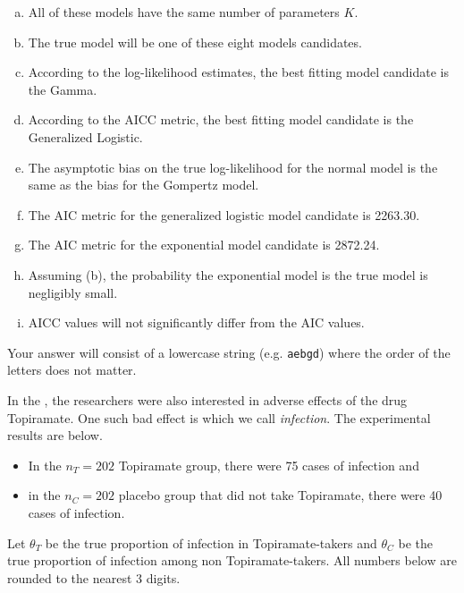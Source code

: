\documentclass[12pt,landscape]{article}
\newcommand{\instr}{\small Your answer will consist of a lowercase string (e.g. \texttt{aebgd}) where the order of the letters does not matter. \normalsize}
\begin{document}
\begin{enumerate}[(a)]
\item All of these models have the same number of parameters $K$.
\item The true model will be one of these eight models candidates.
\item According to the log-likelihood estimates, the best fitting model candidate is the Gamma.
\item According to the AICC metric, the best fitting model candidate is the Generalized Logistic.
\item The asymptotic bias on the true log-likelihood for the normal model is the same as the bias for the Gompertz model.
\item The AIC metric for the generalized logistic model candidate is 2263.30. %
\item The AIC metric for the exponential model candidate is 2872.24. %
\item Assuming (b), the probability the exponential model is the true model is negligibly small.
\item AICC values will not significantly differ from the AIC values.
\end{enumerate}
\eenum\instr\pagebreak



\problem{} In the , the researchers were also interested in adverse effects of the drug Topiramate. One such bad effect is  which we call \emph{infection}. The experimental results are below.

\begin{itemize}
\item In the $n_T = 202$ Topiramate group, there were 75 cases of infection and 
\item in the $n_C = 202$ placebo group that did not take Topiramate, there were 40 cases of infection. 
\end{itemize}
Let $\theta_T$ be the true proportion of infection in Topiramate-takers and $\theta_C$ be the true proportion of infection among non Topiramate-takers.  All numbers below are rounded to the nearest 3 digits.

\vspace{-0.2cm}\benum{} 
\end{document}
